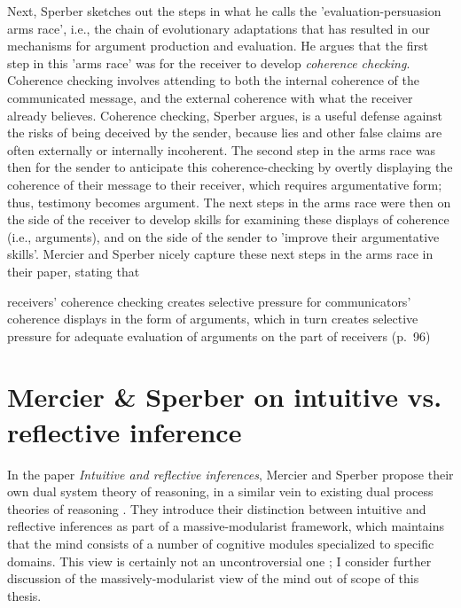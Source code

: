 Next, Sperber sketches out the steps in what he calls the 'evaluation-persuasion arms race', i.e., the chain of evolutionary adaptations that has resulted in our mechanisms for argument production and evaluation.
He argues that the first step in this 'arms race' was for the receiver to develop \emph{coherence checking}. Coherence checking involves attending to both the internal coherence of the communicated message, and the external coherence with what the receiver already believes. Coherence checking, Sperber argues, is a useful defense against the risks of being deceived by the sender, because lies and other false claims are often externally or internally incoherent.
The second step in the arms race was then for the sender to anticipate this coherence-checking by overtly displaying the coherence of their message to their receiver, which requires argumentative form; thus, testimony becomes argument.
The next steps in the arms race were then on the side of the receiver to develop skills for examining these displays of coherence (i.e., arguments), and on the side of the sender to 'improve their argumentative skills'.
Mercier and Sperber nicely capture these next steps in the arms race in their \citeyear{MS11} paper, stating that
\begin{quoting}
    receivers' coherence checking creates selective pressure for communicators' coherence displays in the form of arguments, which in turn creates selective pressure for adequate evaluation of arguments on the part of receivers
    \hfill (p.~96)
\end{quoting}


\section{Mercier \& Sperber on intuitive vs. reflective inference}
\label{sec:MS09}

In the \citeyear{MS09} paper \emph{Intuitive and reflective inferences}, Mercier and Sperber propose their own dual system theory of reasoning, in a similar vein to existing dual process theories of reasoning \citep{Sloman96, Evans03, Evans13, Kahneman11}.
They introduce their distinction between intuitive and reflective inferences as part of a massive-modularist framework, which maintains that the mind consists of a number of cognitive modules specialized to specific domains.
This view is certainly not an uncontroversial one \citep[cf.][\S 3.1]{Novaes18}; I consider further discussion of the massively-modularist view of the mind out of scope of this thesis.

